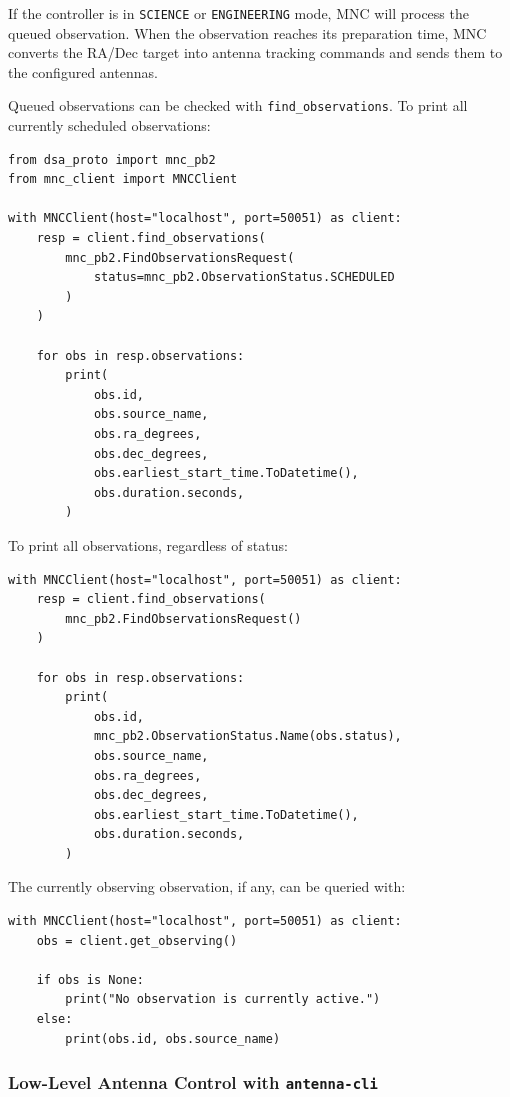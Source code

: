 \documentclass[12pt]{extarticle}
\begin{document}
If the controller is in \texttt{SCIENCE} or \texttt{ENGINEERING} mode, MNC will process the queued observation. When the observation reaches its preparation time, MNC converts the RA/Dec target into antenna tracking commands and sends them to the configured antennas.

Queued observations can be checked with \texttt{find\_observations}. To print all currently scheduled observations:

\begin{lstlisting}
from dsa_proto import mnc_pb2
from mnc_client import MNCClient

with MNCClient(host="localhost", port=50051) as client:
    resp = client.find_observations(
        mnc_pb2.FindObservationsRequest(
            status=mnc_pb2.ObservationStatus.SCHEDULED
        )
    )

    for obs in resp.observations:
        print(
            obs.id,
            obs.source_name,
            obs.ra_degrees,
            obs.dec_degrees,
            obs.earliest_start_time.ToDatetime(),
            obs.duration.seconds,
        )
\end{lstlisting}

To print all observations, regardless of status:

\begin{lstlisting}
with MNCClient(host="localhost", port=50051) as client:
    resp = client.find_observations(
        mnc_pb2.FindObservationsRequest()
    )

    for obs in resp.observations:
        print(
            obs.id,
            mnc_pb2.ObservationStatus.Name(obs.status),
            obs.source_name,
            obs.ra_degrees,
            obs.dec_degrees,
            obs.earliest_start_time.ToDatetime(),
            obs.duration.seconds,
        )
\end{lstlisting}

The currently observing observation, if any, can be queried with:

\begin{lstlisting}
with MNCClient(host="localhost", port=50051) as client:
    obs = client.get_observing()

    if obs is None:
        print("No observation is currently active.")
    else:
        print(obs.id, obs.source_name)
\end{lstlisting}
\subsubsection{Low-Level Antenna Control with \texttt{antenna-cli}}
\end{document}

